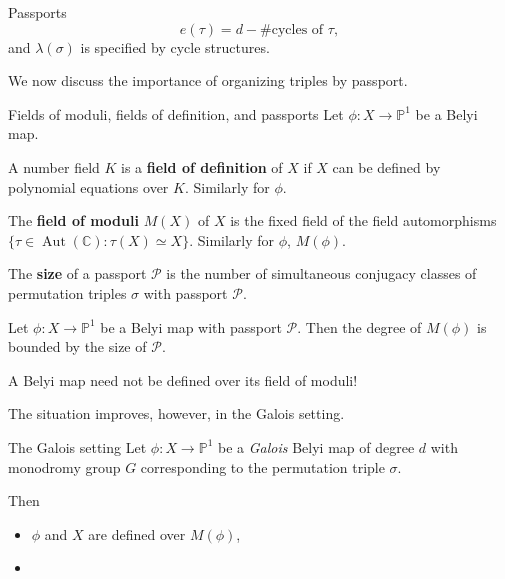\documentclass[xcolor=dvipsnames]{beamer}
\theoremstyle{plain}
\newcommand{\PP}{\mathbb P}
\newcommand{\CC}{\mathbb C}
\DeclareMathOperator{\Aut}{Aut}
\begin{document}
{\begin{frame}{Passports}
      $$
      e(\tau) = d-\#\text{cycles of }\tau,
      $$
      and $\lambda(\sigma)$ is specified by cycle structures.
      \pause
      \par
      We now discuss the importance of organizing triples by passport.
    \end{frame}
    \begin{frame}{Fields of moduli, fields of definition, and passports}
      Let $\phi\colon X\to\PP^1$ be a Belyi map.
      \pause\par
      A number field $K$ is a
      \textbf{field of definition} of $X$
      if $X$ can be defined by polynomial
      equations over $K$.
      Similarly for $\phi$.
      \pause\par
      The \textbf{field of moduli}
      $M(X)$
      of $X$ is
      the fixed field of the field
      automorphisms
      $\{\tau\in\Aut(\CC) : \tau(X)\simeq X\}$.
      Similarly for $\phi$, $M(\phi)$.
      \pause\par
      The \textbf{size} of a passport $\mathcal{P}$
      is the number of simultaneous conjugacy classes
      of permutation triples $\sigma$ with passport
      $\mathcal{P}$.
      \pause
      \begin{theorem}
        \vspace{1pt}
        Let $\phi\colon X\to\PP^1$ be a
        Belyi map with passport $\mathcal{P}$.
        Then the degree of $M(\phi)$ is
        bounded by the size of $\mathcal{P}$.
      \end{theorem}
      \pause
      A Belyi map need not be defined
      over its field of moduli!
      \pause\par
      The situation improves, however,
      in the Galois setting.
    \end{frame}
    \begin{frame}{The Galois setting}
      Let $\phi\colon X\to\PP^1$ be a
      \emph{Galois} Belyi map of degree $d$
      with monodromy group $G$
      corresponding to the permutation triple
      $\sigma$.
      \pause\par
      Then
      \begin{itemize}
        \item
          $\phi$ and $X$ are defined over $M(\phi)$,
        \item

\end{itemize}
\end{frame}}
\end{document}
